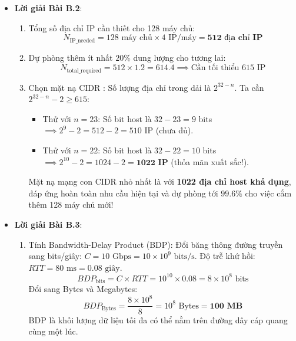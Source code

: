 \begin{itemize}
  \item \textbf{Lời giải Bài B.2}:
  \begin{enumerate}
    \item Tổng số địa chỉ IP cần thiết cho 128 máy chủ:
    \begin{equation*}
    N_{\text{IP\_needed}} = 128\text{ máy chủ} \times 4\text{ IP/máy} = \mathbf{512\text{ địa chỉ IP}}
    \end{equation*}
    \item Dự phòng thêm ít nhất $20\%$ dung lượng cho tương lai:
    \begin{equation*}
    N_{\text{total\_required}} = 512 \times 1.2 = 614.4 \implies \text{Cần tối thiểu } 615\text{ IP}
    \end{equation*}
    \item Chọn mặt nạ CIDR :
    Số lượng địa chỉ trong dải là $2^{32 - n}$. Ta cần $2^{32 - n} - 2 \ge 615$:
    \begin{itemize}
      \item Thử với $n = 23$: Số bit host là $32 - 23 = 9$ bits $\implies 2^9 - 2 = 512 - 2 = 510$ IP (chưa đủ).
      \item Thử với $n = 22$: Số bit host là $32 - 22 = 10$ bits $\implies 2^{10} - 2 = 1024 - 2 = \mathbf{1022\text{ IP}}$ (thỏa mãn xuất sắc!).
    \end{itemize}
    Mặt nạ mạng con CIDR nhỏ nhất là \textbf{} với \textbf{1022 địa chỉ host khả dụng}, đáp ứng hoàn toàn nhu cầu hiện tại và dự phòng tới $99.6\%$ cho việc cắm thêm 128 máy chủ mới!
  \end{enumerate}

  \item \textbf{Lời giải Bài B.3}:
  \begin{enumerate}
    \item Tính Bandwidth-Delay Product (BDP):
    Đổi băng thông đường truyền sang bits/giây: $C = 10\text{ Gbps} = 10 \times 10^9\text{ bits/s}$.
    Độ trễ khứ hồi: $RTT = 80\text{ ms} = 0.08\text{ giây}$.
    \begin{equation*}
    BDP_{\text{bits}} = C \times RTT = 10^{10} \times 0.08 = 8 \times 10^8\text{ bits}
    \end{equation*}
    Đổi sang Bytes và Megabytes:
    \begin{equation*}
    BDP_{\text{Bytes}} = \frac{8 \times 10^8}{8} = 10^8\text{ Bytes} = \mathbf{100\text{ MB}}
    \end{equation*}
    BDP là khối lượng dữ liệu tối đa có thể nằm trên đường dây cáp quang cùng một lúc.
    

\end{enumerate}
\end{itemize}
